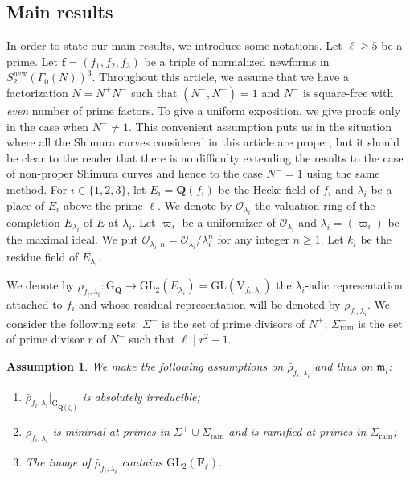 \documentclass[10pt]{amsart}
\numberwithin{equation}{section}
\theoremstyle{plain}
\numberwithin{equation}{section}
\newtheorem{ass}[thm]{Assumption}
\theoremstyle{definition}
\theoremstyle{remark}
\def\GL{\mathrm{GL}}
\def\new{\mathrm{new}}
\def\frakm{\mathfrak{m}}
\def\ram{\mathrm{ram}}
\def\triplef{\underline{\mathbf{f}}}
\def\calO{\mathcal{O}}
\def\frakm{\mathfrak{m}}
\def\FF{\mathbf{F}}
\def\QQ{\mathbf{Q}}
\def\rmG{\mathrm{G}}
\def\rmV{\mathrm{V}}
\begin{document}
\subsection{Main results} In order to state our main results, we introduce some notations. Let $\ell\geq 5$ be a prime. Let $\triplef=(f_{1}, f_{2}, f_{3})$ be a triple of normalized newforms in $S^{\new}_{2}(\Gamma_{0}(N))^{3}$. Throughout this article, we assume that we have a factorization $N=N^{+}N^{-}$ such that $(N^{+}, N^{-})=1$ and $N^{-}$ is square-free with \emph{even} number of prime factors. To give a uniform exposition, we give proofs only in the case when $N^{-}\neq 1$. This convenient assumption puts us in the situation where all the Shimura curves considered in this article are proper, but it should be clear to the reader that there is no difficulty extending the results to the case of non-proper Shimura curves and hence to the case $N^{-}=1$ using the same method.  For $i\in\{1, 2, 3\}$, let $E_{i}=\QQ(f_{i})$ be the Hecke field of $f_{i}$ and $\lambda_{i}$ be a place of $E_{i}$ above the prime $\ell$. We denote by $\calO_{\lambda_{i}}$ the valuation ring of the completion $E_{\lambda_{i}}$ of $E$ at $\lambda_{i}$. Let $\varpi_{i}$ be a uniformizer of  $\calO_{\lambda_{i}}$ and $\lambda_{i}=(\varpi_{i})$ be the maximal ideal. We put $\calO_{\lambda_{i}, n}=\calO_{\lambda_{i}}/\lambda_{i}^{n}$ for any integer $n\geq 1$. Let $k_{i}$ be the residue field of $E_{\lambda_{i}}$. 

We denote by ${\rho}_{f_{i}, \lambda_{i}}: \rmG_{\QQ}\rightarrow \GL_{2}(E_{\lambda_{i}})=\GL(\rmV_{f_{i},\lambda_{i}})$ the $\lambda_{i}$-adic representation attached to $f_{i}$ and whose residual representation will be denoted by $\bar{\rho}_{f_{i}, \lambda_{i}}$.  We consider the following sets: $\Sigma^{+}$ is the set of prime divisors of $N^{+}$; $\Sigma^{-}_{\ram}$ is the set of prime divisor $r$ of $N^{-}$ such that $\ell \mid r^{2}-1$. 
\begin{ass}\label{intro-ass}
We make the following assumptions on $\bar{\rho}_{f_{i}, \lambda_{i}}$ and thus on $\frakm_{i}$:
\begin{enumerate}
\item  $\bar{\rho}_{f_{i}, \lambda_{i}}\vert_{\rmG_{\QQ(\zeta_{\ell})}}$ is absolutely irreducible;
\item  $\bar{\rho}_{f_{i}, \lambda_{i}}$ is minimal at primes in $\Sigma^{+}\cup\Sigma^{-}_{\ram}$ and is ramified at primes in $\Sigma^{-}_{\ram}$;
\item The image of $\bar{\rho}_{f_{i}, \lambda_{i}}$ contains $\GL_{2}(\FF_{\ell})$.
\end{enumerate}
\end{ass}
\end{document}
